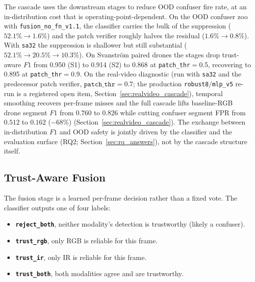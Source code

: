 The cascade uses the downstream stages to reduce OOD confuser fire rate, at an in-distribution cost that is operating-point-dependent. On the OOD confuser zoo with \texttt{fusion\_no\_fn\_v1.1}, the classifier carries the bulk of the suppression ($52.1\% \to 1.6\%$) and the patch verifier roughly halves the residual ($1.6\% \to 0.8\%$). With \texttt{sa32} the suppression is shallower but still substantial ($52.1\% \to 20.5\% \to 10.3\%$). On Svanstr\"om paired drones the stages drop trust-aware $F1$ from 0.950 (S1) to 0.914 (S2) to 0.868 at \texttt{patch\_thr}$=$0.5, recovering to 0.895 at \texttt{patch\_thr}$=$0.9. On the real-video diagnostic (run with \texttt{sa32} and the predecessor patch verifier, $\mathtt{patch\_thr}=0.7$; the production \texttt{robust8}/\texttt{mlp\_v5} re-run is a registered open item, Section~\ref{sec:realvideo_cascade}), temporal smoothing recovers per-frame misses and the full cascade lifts baseline-RGB drone segment $F1$ from $0.760$ to $0.826$ while cutting confuser segment FPR from $0.512$ to $0.162$ ($-68\%$) (Section~\ref{sec:realvideo_cascade}). The exchange between in-distribution $F1$ and OOD safety is jointly driven by the classifier and the evaluation surface (RQ2; Section~\ref{sec:rq_answers}), not by the cascade structure itself.

\subsection{Trust-Aware Fusion}
\label{sec:trust_fusion}

The fusion stage is a learned per-frame decision rather than a fixed vote. The classifier outputs one of four labels:

\begin{itemize}
    \item \textbf{\texttt{reject\_both}}, neither modality's detection is trustworthy (likely a confuser).
    \item \textbf{\texttt{trust\_rgb}}, only RGB is reliable for this frame.
    \item \textbf{\texttt{trust\_ir}}, only IR is reliable for this frame.
    \item \textbf{\texttt{trust\_both}}, both modalities agree and are trustworthy.
\end{itemize}

